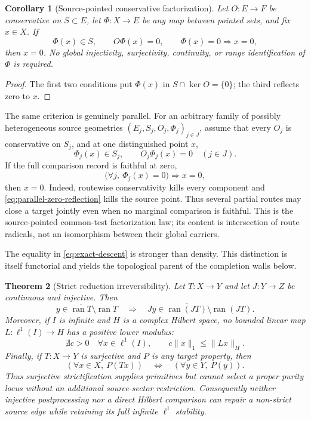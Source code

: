 \documentclass[11pt]{article}
\newtheorem{theorem}{Theorem}[section]
\newtheorem{corollary}[theorem]{Corollary}
\theoremstyle{definition}
\theoremstyle{remark}
\begin{document}
\begin{corollary}[Source-pointed conservative factorization]
\label{cor:source-pointed-factorization}
Let \(O:E\to F\) be conservative on \(S\subset E\), let
\(\Phi:X\to E\) be any map between pointed sets, and fix \(x\in X\).  If
\[
       \Phi(x)\in S,\qquad O\Phi(x)=0,
       \qquad \Phi(x)=0\Longrightarrow x=0,
\tag{2.0ea}\label{eq:source-pointed-factorization}
\]
then \(x=0\).  No global injectivity, surjectivity, continuity, or range
identification of \(\Phi\) is required.
\end{corollary}

\begin{proof}
The first two conditions put \(\Phi(x)\) in \(S\cap\ker O=\{0\}\); the
third reflects zero to \(x\).
\end{proof}

The same criterion is genuinely parallel.  For an arbitrary family of
possibly heterogeneous source geometries
\((E_j,S_j,O_j,\Phi_j)_{j\in J}\), assume that every \(O_j\) is
conservative on \(S_j\), and at one distinguished point \(x\),
\[
 \Phi_j(x)\in S_j,\qquad O_j\Phi_j(x)=0\quad(j\in J).
\tag{2.0eb}\label{eq:parallel-pointed-factorization}
\]
If the full comparison record is faithful at zero,
\[
              \bigl(\forall j,\ \Phi_j(x)=0\bigr)
                    \Longrightarrow x=0,
\tag{2.0ec}\label{eq:parallel-zero-reflection}
\]
then \(x=0\).  Indeed, routewise conservativity kills every component and
\eqref{eq:parallel-zero-reflection} kills the source point.  Thus several
partial routes may close a target jointly even when no marginal comparison
is faithful.  This is the source-pointed common-test factorization law; its
content is intersection of route radicals, not an isomorphism between their
global carriers.

The equality in \eqref{eq:exact-descent} is stronger than density.  This
distinction is itself functorial and yields the topological parent of the
completion walls below.

\begin{theorem}[Strict reduction irreversibility]
\label{thm:strict-reduction}
Let \(T:X\to Y\) and let \(J:Y\to Z\) be continuous and injective.  Then
\[
 y\in\overline{\operatorname{ran}T}\setminus\operatorname{ran}T
 \quad\Longrightarrow\quad
 Jy\in\overline{\operatorname{ran}(JT)}\setminus\operatorname{ran}(JT).
\tag{2.0f}\label{eq:closure-only-persistence}
\]
Moreover, if \(I\) is infinite and \(H\) is a complex Hilbert space, no
bounded linear map \(L:\ell^1(I)\to H\) has a positive lower modulus:
\[
       \nexists c>0\quad\forall x\in\ell^1(I),\qquad
       c\|x\|_1\le\|Lx\|_H.
\tag{2.0g}\label{eq:l1-hilbert-wall}
\]
Finally, if \(T:X\to Y\) is surjective and \(P\) is any target property,
then
\[
             (\forall x\in X,\ P(Tx))
             \quad\Longleftrightarrow\quad
             (\forall y\in Y,\ P(y)).
\tag{2.0ga}\label{eq:surjective-no-selection}
\]
Thus surjective strictification supplies primitives but cannot select a
proper purity locus without an additional source-sector restriction.
Consequently neither injective postprocessing nor a direct Hilbert
comparison can repair a non-strict source edge while retaining its full
infinite \(\ell^1\) stability.
\end{theorem}
\end{document}
